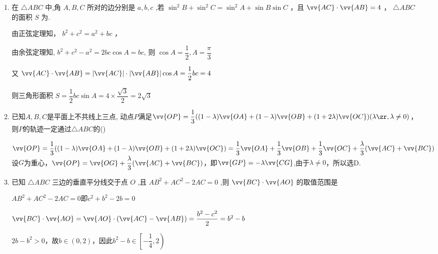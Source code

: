 \begin{enumerate}
    \item 在 $\bigtriangleup {ABC}$ 中,角 $A,B,C$ 所对的边分别是 $a,b,c$ ,若 ${\sin }^{2}B + {\sin }^{2}C = {\sin }^{2}A + \sin B\sin C$ ，且 $\vv{AC} \cdot  \vv{AB} = 4$ ， $\bigtriangleup  {ABC}$ 的面积 $S$ 为.
    \begin{jieda}
        由正弦定理知， ${b}^{2} + {c}^{2} = {a}^{2} + {bc}$ ，
        
        由余弦定理知, ${b}^{2} + {c}^{2} - {a}^{2} = {2bc}\cos A = {bc}$, 则 $\cos A = \dfrac{1}{2},A = \dfrac{\pi }{3}$
        
        又 $\vv{AC} \cdot  \vv{AB} = \left| \vv{AC}\right|  \cdot  \left| \vv{AB}\right| \cos A = \dfrac{1}{2}{bc} = 4$
        
        则三角形面积 $S = \dfrac{1}{2}{bc}\sin A = 4 \times  \dfrac{\sqrt{3}}{2} = 2\sqrt{3}$
    \end{jieda}

    \item 已知$A,B,C$是平面上不共线上三点, 动点$P$满足$\vv{OP}=\dfrac{1}{3}((1-\lambda)\vv{OA}+(1-\lambda)\vv{OB}+(1+2\lambda)\vv{OC})(\lambda\zr,\lambda\neq 0)$，则$P$的轨迹一定通过$\triangle{ABC}$的\dotfill()
    \begin{jieda}
        $\vv{OP}=\dfrac{1}{3}((1-\lambda)\vv{OA}+(1-\lambda)\vv{OB}+(1+2\lambda)\vv{OC}) = \dfrac{1}{3}\vv{OA} + \dfrac{1}{3}\vv{OB} + \dfrac{1}{3} \vv{OC} + \dfrac{\lambda}{3}(\vv{AC} + \vv{BC})$\\
        设$G$为重心，$\vv{OP} = \vv{OG} + \dfrac{\lambda}{3}(\vv{AC} + \vv{BC})$，即$\vv{GP} = -\lambda \vv{CG}$,由于$\lambda \neq 0$，所以选D.
    \end{jieda}

    \item 已知 $\bigtriangleup  {ABC}$ 三边的垂直平分线交于点 $O$ ,且 $A{B}^{2} + A{C}^{2} - {2AC} = 0$ ,则 $\vv{BC} \cdot  \vv{AO}$ 的取值范围是\blkda{$\left[ -\dfrac{1}{4},2\right)$}
    \begin{jieda}
        $A{B}^{2} + A{C}^{2} - {2AC} = 0$即$c^2+b^2-2b = 0$

        $\vv{BC} \cdot  \vv{AO} = \vv{AO} \cdot (\vv{AC} - \vv{AB}) = \dfrac{b^2 - c^2}{2} = b^2 - b$

        $2b - b^2 > 0$，故$b \in (0, 2)$，因此$b^2 - b \in \left[ -\dfrac{1}{4},2\right)$
    \end{jieda}


\end{enumerate}
